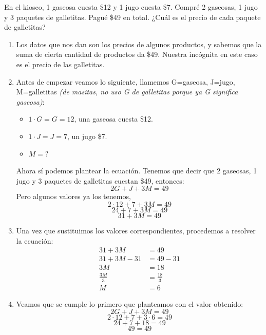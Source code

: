 \documentclass{article}
\begin{document}
\begin{ejemplo}
En el kiosco, 1 gaseosa cuesta \$12 y 1 jugo cuesta \$7.
Compré 2 gaseosas, 1 jugo y 3 paquetes de galletitas. Pagué \$49 en total.
¿Cuál es el precio de cada paquete de galletitas?

\begin{enumerate}
	\item Los datos que nos dan son los precios de algunos productos, y sabemos que la suma de cierta cantidad de productos da \$49. Nuestra incógnita en este caso es el precio de las galletitas.
	\item Antes de empezar veamos lo siguiente, llamemos G=gaseosa, J=jugo, M=galletitas \textit{(de masitas, no uso G de galletitas porque ya G significa gaseosa)}:
		\begin{itemize}
			\item $1\cdot G=G=12$, una gaseosa cuesta \$12.
			\item $1\cdot J=J=7$, un jugo \$7.
			\item $M=?$
		\end{itemize}
Ahora sí podemos plantear la ecuación. Tenemos que decir que 2 gaseosas, 1 jugo y 3 paquetes de galletitas cuestan \$49, entonces:
	\[2G+J+3M=49\]
	Pero algunos valores ya los tenemos,
	\[2\cdot12+7+3M=49\]
	\[24+7+3M=49\]
	\[31+3M=49\]
	\item Una vez que sustituimos los valores correspondientes, procedemos a resolver la ecuación:
		\begin{align}
		31+3M&=49\nonumber\\
		31+3M-31&=49-31\nonumber\\
		3M&=18\nonumber\\
		\frac{3M}{3}&=\frac{18}{3}\nonumber\\
		M&=6\nonumber
		\end{align}
	\item Veamos que se cumple lo primero que planteamos con el valor obtenido:
	\[2G+J+3M=49\]
	\[2\cdot12+7+3\cdot6=49\]
	\[24+7+18=49\]
	\[49=49\]
\end{enumerate}

\end{ejemplo}
\end{document}
